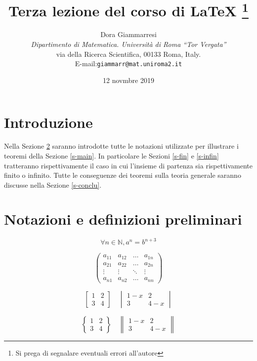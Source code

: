 \documentclass[11pt]{article}
\title{ { \bf Terza lezione del corso di \LaTeX } \thanks{Si prega di segnalare eventuali errori all'autore}}
\author{
   \Large{Dora Giammarresi}\\ \emph {Dipartimento di Matematica.
   Università di Roma ``Tor Vergata''}\\
   via della Ricerca Scientifica, 00133 Roma, Italy. \\ E-mail:{\tt giammarr@mat.uniroma2.it}
}
\date{12 novmbre 2019} %
\newcommand{\N}{\mathbb{N}}
\begin{document}
\maketitle %


\section{Introduzione}\label{s-intro}

Nella Sezione \ref{s-preli} saranno introdotte tutte le notazioni utilizzate per illustrare i teoremi della Sezione \ref{s-main}.
In particolare le Sezioni \ref{s-fin} e \ref{s-infin} tratteranno rispettivamente il caso in cui l'insieme di partenza sia rispettivamente finito o infinito.
Tutte le conseguenze dei teoremi sulla teoria generale saranno discusse nella Sezione \ref{s-conclu}.


\section{Notazioni e definizioni preliminari}\label{s-preli}

\begin{equation}\label{eq-defsim}
\forall n\in \N ,  a^n=b^{n+3}
\end{equation}

\begin{equation*}
\begin{pmatrix}
a_{11} & a_{12} & \dots & a_{1n} \\
a_{21} & a_{22} & \dots & a_{2n} \\
\vdots & \vdots & \ddots & \vdots \\
a_{n1} & a_{n2} & \dots & a_{nn}
\end{pmatrix}
\end{equation*}


\begin{equation*}
\begin{bmatrix} 1 & 2 \\ 3 & 4
\end{bmatrix} \quad
\begin{vmatrix} 1-x & 2 \\ 3 & 4-x
\end{vmatrix}
\end{equation*}

\begin{equation*}
\begin{Bmatrix} 1 & 2 \\ 3 & 4
\end{Bmatrix} \quad
\begin{Vmatrix} 1-x & 2 \\ 3 & 4-x
\end{Vmatrix}
\end{equation*}
\end{document}
